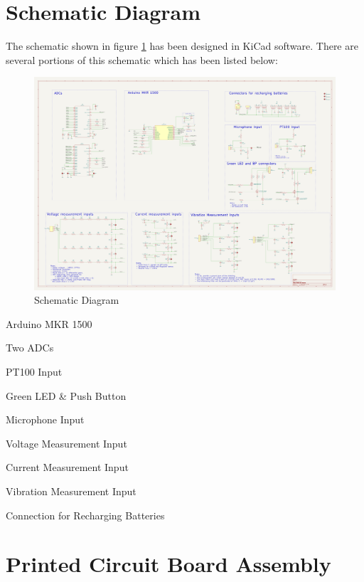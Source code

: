 \section{Schematic Diagram} 
The schematic shown in figure \ref{fig:x Schematic} has been designed in KiCad software. There are several portions of this schematic which has been listed below:
\begin{figure}[htbp]
\centering
\includegraphics[scale=0.18]{images/Schematic.png}
\caption{Schematic Diagram}
\label{fig:x Schematic}
\end{figure}

\begin{itemize}
\begin{multicols}{2}
  \item Arduino MKR 1500
  \item Two ADCs
    \item PT100 Input
  \item Green LED \& Push Button 
  \item Microphone Input
  \item Voltage Measurement Input
  \item Current Measurement Input
  \item Vibration Measurement Input
   \item Connection for Recharging Batteries
\end{multicols}
\end{itemize}







\section{Printed Circuit Board Assembly} 

